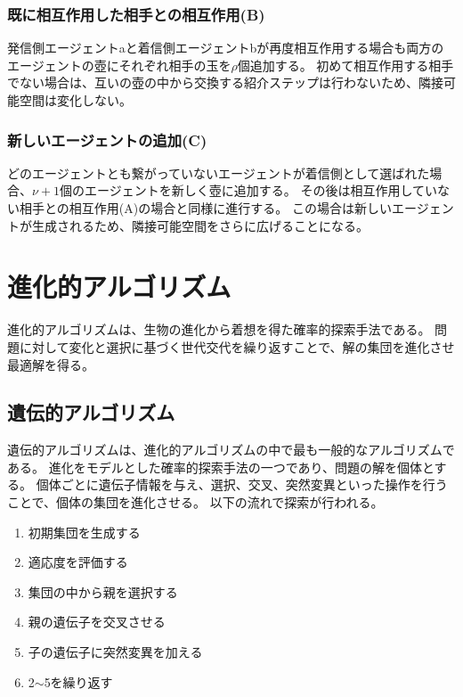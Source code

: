 \documentclass[uplatex,11pt,openany]{ujreport}
\begin{document}
            \subsubsection*{既に相互作用した相手との相互作用(B)}
            発信側エージェントaと着信側エージェントbが再度相互作用する場合も両方のエージェントの壺にそれぞれ相手の玉を$\rho$個追加する。
            初めて相互作用する相手でない場合は、互いの壺の中から交換する紹介ステップは行わないため、隣接可能空間は変化しない。

            \subsubsection*{新しいエージェントの追加(C)}
            どのエージェントとも繋がっていないエージェントが着信側として選ばれた場合、$\nu+1$個のエージェントを新しく壺に追加する。
            その後は相互作用していない相手との相互作用(A)の場合と同様に進行する。
            この場合は新しいエージェントが生成されるため、隣接可能空間をさらに広げることになる。







    \section{進化的アルゴリズム}
    進化的アルゴリズムは、生物の進化から着想を得た確率的探索手法である。
    問題に対して変化と選択に基づく世代交代を繰り返すことで、解の集団を進化させ最適解を得る。


        \subsection{遺伝的アルゴリズム}
        遺伝的アルゴリズムは、進化的アルゴリズムの中で最も一般的なアルゴリズムである。
        進化をモデルとした確率的探索手法の一つであり、問題の解を個体とする。
        個体ごとに遺伝子情報を与え、選択、交叉、突然変異といった操作を行うことで、個体の集団を進化させる。
        以下の流れで探索が行われる。
            \begin{enumerate}
                \item 初期集団を生成する
                \item 適応度を評価する
                \item 集団の中から親を選択する
                \item 親の遺伝子を交叉させる
                \item 子の遺伝子に突然変異を加える
                \item 2$\sim$5を繰り返す
            \end{enumerate}
\end{document}
